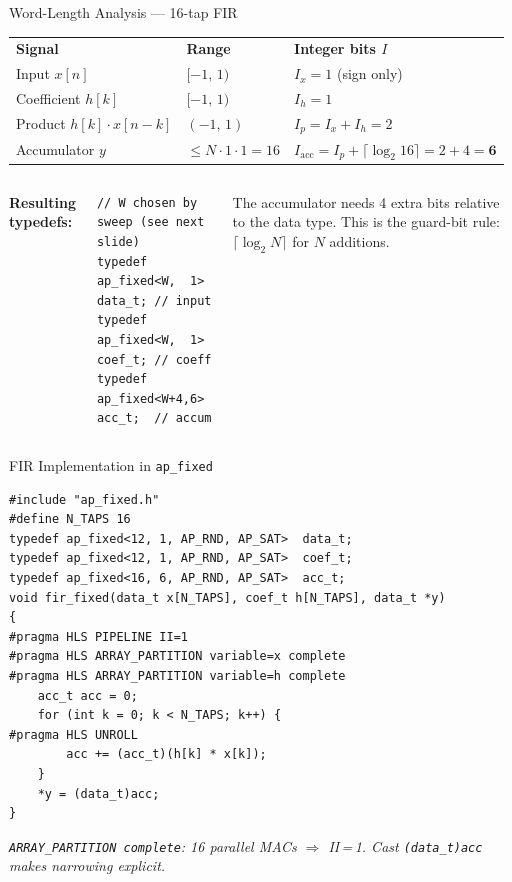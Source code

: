 \documentclass[aspectratio=169,12pt]{beamer}
\begin{document}
\begin{frame}[t,fragile]{Word-Length Analysis --- 16-tap FIR}
\vspace{0.01cm}
{\setlength{\extrarowheight}{0pt}
\begin{tabular}{p{3.0cm}p{4.8cm}p{5.6cm}}
\rowcolor{Navy}
\textbf{\color{white}Signal} &
\textbf{\color{white}Range} &
\textbf{\color{white}Integer bits $I$}\\
Input $x[n]$     & $[-1,\,1)$                     & $I_x = 1$ (sign only)\\
Coefficient $h[k]$& $[-1,\,1)$                    & $I_h = 1$\\
Product $h[k]\cdot x[n{-}k]$ & $(-1,\,1)$         & $I_p = I_x + I_h = 2$\\
\rowcolor{Teal!10}
Accumulator $y$  & $\leq N \cdot 1 \cdot 1 = 16$  &
  $I_{\text{acc}} = I_p + \lceil\log_2 16\rceil = 2 + 4 = \mathbf{6}$\\
\end{tabular}}
\vspace{0.03cm}
\begin{columns}[T,totalwidth=\textwidth]
  {\color{Navy}\bfseries Resulting typedefs:}
\begin{lstlisting}
// W chosen by sweep (see next slide)
typedef ap_fixed<W,  1> data_t; // input
typedef ap_fixed<W,  1> coef_t; // coeff
typedef ap_fixed<W+4,6> acc_t;  // accum
\end{lstlisting}
  \vspace{0.04cm}
  \colorbox{Orange!12}{\parbox{\dimexpr\linewidth-2\fboxsep\relax}{%
    \vspace{1pt}
    {\small\color{NavyDk}
      The accumulator needs 4 extra bits relative to the data type.
      This is the guard-bit rule:
      $\lceil\log_2 N\rceil$ for $N$ additions.}
    \vspace{1pt}
  }}
\end{columns}
\end{frame}

\begin{frame}[fragile]{FIR Implementation in \texttt{ap\_fixed}}
\begin{lstlisting}[basicstyle=\ttfamily\scriptsize,aboveskip=1pt,belowskip=1pt]
#include "ap_fixed.h"
#define N_TAPS 16
typedef ap_fixed<12, 1, AP_RND, AP_SAT>  data_t;
typedef ap_fixed<12, 1, AP_RND, AP_SAT>  coef_t;
typedef ap_fixed<16, 6, AP_RND, AP_SAT>  acc_t;
void fir_fixed(data_t x[N_TAPS], coef_t h[N_TAPS], data_t *y)
{
#pragma HLS PIPELINE II=1
#pragma HLS ARRAY_PARTITION variable=x complete
#pragma HLS ARRAY_PARTITION variable=h complete
    acc_t acc = 0;
    for (int k = 0; k < N_TAPS; k++) {
#pragma HLS UNROLL
        acc += (acc_t)(h[k] * x[k]);
    }
    *y = (data_t)acc;
}
\end{lstlisting}
{\scriptsize\color{MidGray}\itshape
  \texttt{ARRAY\_PARTITION complete}: 16 parallel MACs $\Rightarrow$ II\,=\,1.
  Cast \texttt{(data\_t)acc} makes narrowing explicit.}
\end{frame}
\end{document}
